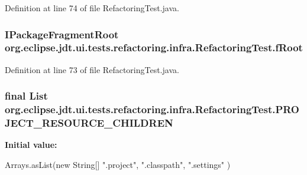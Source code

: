 Definition at line 74 of file RefactoringTest.java.

\hypertarget{classorg_1_1eclipse_1_1jdt_1_1ui_1_1tests_1_1refactoring_1_1infra_1_1RefactoringTest_aea3c45c88142e0a7f29b1c229cb38640}{
\subsubsection[{fRoot}]{\setlength{\rightskip}{0pt plus 5cm}IPackageFragmentRoot {\bf org.eclipse.jdt.ui.tests.refactoring.infra.RefactoringTest.fRoot}}}
\label{classorg_1_1eclipse_1_1jdt_1_1ui_1_1tests_1_1refactoring_1_1infra_1_1RefactoringTest_aea3c45c88142e0a7f29b1c229cb38640}


Definition at line 73 of file RefactoringTest.java.

\hypertarget{classorg_1_1eclipse_1_1jdt_1_1ui_1_1tests_1_1refactoring_1_1infra_1_1RefactoringTest_a13b97bc899dec84a2a928a647ccad94e}{
\subsubsection[{PROJECT\_\-RESOURCE\_\-CHILDREN}]{\setlength{\rightskip}{0pt plus 5cm}final List {\bf org.eclipse.jdt.ui.tests.refactoring.infra.RefactoringTest.PROJECT\_\-RESOURCE\_\-CHILDREN}}}
\label{classorg_1_1eclipse_1_1jdt_1_1ui_1_1tests_1_1refactoring_1_1infra_1_1RefactoringTest_a13b97bc899dec84a2a928a647ccad94e}
{\bfseries Initial value:}
\begin{DoxyCode}
 Arrays.asList(new String[] {
               ".project", ".classpath", ".settings" })
\end{DoxyCode}


